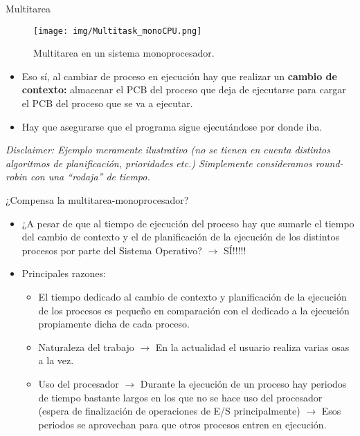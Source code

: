 \documentclass{beamer}
\begin{document}
\begin{frame}{Multitarea}
  \begin{figure}
        \centering
        \texttt{[image: img/Multitask\_monoCPU.png]} 
        \caption{Multitarea en un sistema monoprocesador.}
    \end{figure}

\begin{itemize}
    \item Eso sí, al cambiar de proceso en ejecución hay que realizar un \textbf{cambio de contexto:} almacenar el PCB del proceso que deja de ejecutarse para cargar el PCB del proceso que se va a ejecutar. 
    \item Hay que asegurarse que el programa sigue ejecutándose por donde iba.
\end{itemize}

\tiny{\textit{Disclaimer: Ejemplo meramente ilustrativo (no se tienen en cuenta distintos algoritmos de planificación, prioridades etc.) Simplemente consideramos round-robin con una “rodaja” de tiempo.}}
\end{frame}


\begin{frame}{¿Compensa la multitarea-monoprocesador?}
\begin{itemize}
\item ¿A pesar de que al tiempo de ejecución del proceso hay que sumarle el tiempo del cambio de contexto y el de planificación de la ejecución de los distintos procesos por parte del Sistema Operativo? $\to$ SÍ!!!!!
\item Principales razones:
\begin{itemize}
\item El tiempo dedicado al cambio de contexto y planificación de la ejecución de los procesos es pequeño en comparación con el dedicado a la ejecución propiamente dicha de cada proceso.
\item Naturaleza del trabajo $\to$ En la actualidad el usuario realiza varias osas a la vez.
\item Uso del procesador $\to$ Durante la ejecución de un proceso hay periodos de tiempo bastante largos en los que no se hace uso del procesador (espera de finalización de operaciones de E/S principalmente) $\to$ Esos periodos se aprovechan para que otros procesos entren en ejecución.
\end{itemize}
\end{itemize}
\end{frame}
\end{document}
